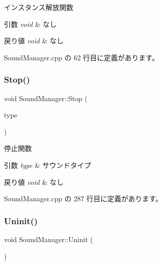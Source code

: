 インスタンス解放関数 


\begin{DoxyParams}{引数}
{\em void} & なし \\
\hline
\end{DoxyParams}

\begin{DoxyRetVals}{戻り値}
{\em void} & なし \\
\hline
\end{DoxyRetVals}


 Sound\+Manager.\+cpp の 62 行目に定義があります。

\mbox{\label{class_sound_manager_a97ace4d5c214d5a97f749e2c76e2c18d}} 
\subsubsection{\texorpdfstring{Stop()}{Stop()}}
{\footnotesize\ttfamily void Sound\+Manager\+::\+Stop (\begin{DoxyParamCaption}\item[{\mbox{\hyperlink{class_sound_manager_a0b81fc2281f062cd6489ab281fc3be1d}{Type}}}]{type }\end{DoxyParamCaption})}



停止関数 


\begin{DoxyParams}{引数}
{\em type} & サウンドタイプ \\
\hline
\end{DoxyParams}

\begin{DoxyRetVals}{戻り値}
{\em void} & なし \\
\hline
\end{DoxyRetVals}


 Sound\+Manager.\+cpp の 287 行目に定義があります。

\mbox{\label{class_sound_manager_a61543e2532817e5116fa4f7808545921}} 
\subsubsection{\texorpdfstring{Uninit()}{Uninit()}}
{\footnotesize\ttfamily void Sound\+Manager\+::\+Uninit (\begin{DoxyParamCaption}{ }\end{DoxyParamCaption})}



